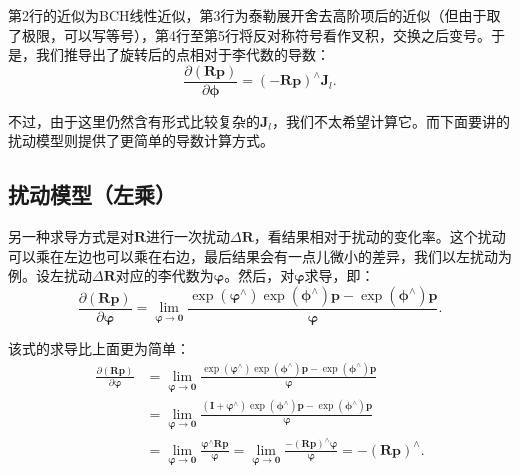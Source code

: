 第2行的近似为BCH线性近似，第3行为泰勒展开舍去高阶项后的近似（但由于取了极限，可以写等号），第4行至第5行将反对称符号看作叉积，交换之后变号。于是，我们推导出了旋转后的点相对于李代数的导数：
\begin{equation}
\frac{{\partial \left( { \bm{Rp}} \right)}}{{\partial \boldsymbol{\phi} }} = {\left( { - \bm{Rp}} \right)^ \wedge }{\bm{J}_l}.
\end{equation}

不过，由于这里仍然含有形式比较复杂的$\bm{J}_l$，我们不太希望计算它。而下面要讲的扰动模型则提供了更简单的导数计算方式。

\subsection{扰动模型（左乘）}
另一种求导方式是对$\bm{R}$进行一次扰动$\Delta \bm{R}$，看结果相对于扰动的变化率。这个扰动可以乘在左边也可以乘在右边，最后结果会有一点儿微小的差异，我们以左扰动为例。设左扰动$\Delta \bm{R}$对应的李代数为$\boldsymbol{\varphi}$。然后，对$\boldsymbol{\varphi}$求导，即：
\begin{equation}
\frac{{\partial \left( {\bm{Rp}} \right)}}{{\partial \boldsymbol{\varphi} }} = \mathop {\lim }\limits_{\boldsymbol{\varphi}  \to \bm{0}} \frac{{\exp \left( {{\boldsymbol{\varphi} ^ \wedge }} \right)\exp \left( {{\boldsymbol{\phi} ^ \wedge }} \right)\bm{p} - \exp \left( {{\boldsymbol{\phi} ^ \wedge }} \right)\bm{p}}}{\boldsymbol{\varphi} }.
\end{equation}

该式的求导比上面更为简单：
\begin{align*}
\frac{{\partial \left( {\bm{Rp}} \right)}}{{\partial \boldsymbol{\varphi} }} &= \mathop {\lim }\limits_{\boldsymbol{\varphi}  \to \bm{0}} \frac{{\exp \left( {{\boldsymbol{\varphi} ^ \wedge }} \right)\exp \left( {{\boldsymbol{\phi} ^ \wedge }} \right)\bm{p} - \exp \left( {{\boldsymbol{\phi} ^ \wedge }} \right)\bm{p}}}{ \boldsymbol{\varphi} }\\
&= \mathop {\lim }\limits_{\boldsymbol{\varphi } \to \bm{0}} \frac{{\left( {\bm{I} + {\boldsymbol{\varphi }^ \wedge }} \right)\exp \left( {{\boldsymbol{\phi} ^ \wedge }} \right)\bm{p} - \exp \left( {{\boldsymbol{\phi} ^ \wedge }} \right)\bm{p}}}{\boldsymbol{\varphi} }\\
&= \mathop {\lim }\limits_{\boldsymbol{\varphi}  \to \bm{0}} \frac{{{\boldsymbol{\varphi} ^ \wedge }\bm{Rp}}}{\boldsymbol{\varphi} } = \mathop {\lim }\limits_{\boldsymbol{\varphi}  \to \bm{0}} \frac{{ - {{\left( \bm{Rp} \right)}^ \wedge }\boldsymbol{\varphi} }}{\boldsymbol{\varphi} } =  - {\left( \bm{Rp} \right)^ \wedge }.
\end{align*}

